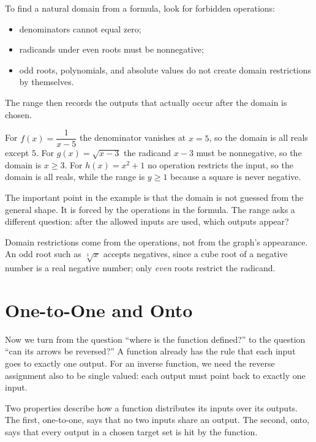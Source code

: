 \documentclass[12pt]{book}
\begin{document}
\begin{keyidea}
To find a natural domain from a formula, look for forbidden operations:
\begin{itemize}\setlength{\itemsep}{2pt}
  \item denominators cannot equal zero;
  \item radicands under even roots must be nonnegative;
  \item odd roots, polynomials, and absolute values do not create domain restrictions
        by themselves.
\end{itemize}
The range then records the outputs that actually occur after the domain is chosen.
\end{keyidea}

\begin{example}
For $f(x)=\dfrac{1}{x-5}$ the denominator vanishes at $x=5$, so the domain is all
reals except $5$. For $g(x)=\sqrt{x-3}$ the radicand $x-3$ must be nonnegative, so the
domain is $x\ge 3$. For $h(x)=x^2+1$ no operation restricts the input, so the domain is
all reals, while the range is $y\ge 1$ because a square is never negative.
\end{example}

The important point in the example is that the domain is not guessed from the general
shape. It is forced by the operations in the formula. The range asks a different
question: after the allowed inputs are used, which outputs appear?

\begin{pitfall}
Domain restrictions come from the operations, not from the graph's appearance. An odd
root such as $\sqrt[3]{x}$ accepts negatives, since a cube root of a negative number is
a real negative number; only \emph{even} roots restrict the radicand.
\end{pitfall}

\section{One-to-One and Onto}

Now we turn from the question ``where is the function defined?'' to the question ``can
its arrows be reversed?'' A function already has the rule that each input goes to exactly
one output. For an inverse function, we need the reverse assignment also to be single
valued: each output must point back to exactly one input.

Two properties describe how a function distributes its inputs over its outputs. The first,
one-to-one, says that no two inputs share an output. The second, onto, says that every
output in a chosen target set is hit by the function.
\end{document}
